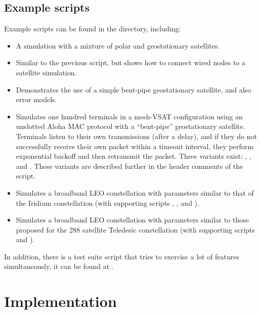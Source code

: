 
\subsection{Example scripts}
\label{sec:satellite/usage/example}

Example scripts can be found in the  directory, including:
\begin{itemize}
\item {}  A simulation with a mixture of polar and
geostationary satellites.
\item {}  Similar to the previous script, but shows how
to connect wired nodes to a satellite simulation.
\item {}  Demonstrates the use of a simple bent-pipe
geostationary satellite, and also error models.
\item {}  Simulates one hundred terminals in a mesh-VSAT
configuration using an unslotted Aloha MAC protocol 
with a ``bent-pipe'' geostationary satellite.  Terminals listen to their
own transmissions (after a delay), and if they do not successfully receive
their own packet within a timeout interval, they perform exponential 
backoff and then retransmit the packet. Three variants exist:
, , and .  These variants
are described further in the header comments of the script.
\item {}  Simulates a broadband LEO constellation with
parameters similar to that of the Iridium constellation (with supporting
scripts , , 
and ).
\item {}  Simulates a broadband LEO constellation with
parameters similar to those proposed for the 288 satellite Teledesic
constellation (with supporting scripts  and 
).
\end{itemize}
In addition, there is a test suite script that tries to exercise a lot
of features simultaneously, it can be found at .


\section{Implementation}
\label{sec:satellite/implementation}

